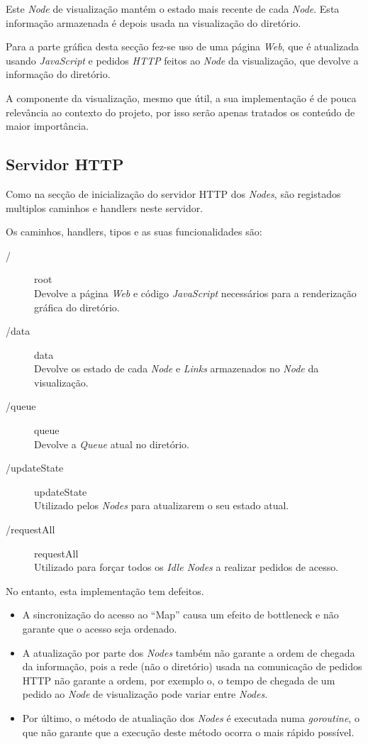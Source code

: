 Este \emph{Node} de visualização mantém o estado mais recente de cada \emph{Node}. 
Esta informação armazenada é depois usada na visualização do diretório.

Para a parte gráfica desta secção fez-se uso de uma página \emph{Web}, que é atualizada usando \emph{JavaScript} e 
pedidos \emph{HTTP} feitos ao \emph{Node} da visualização, que devolve a informação do diretório.

A componente da visualização, mesmo que útil, a sua implementação é de pouca relevância ao contexto do projeto,
por isso serão apenas tratados os conteúdo de maior importância.



\subsection{Servidor \acs{HTTP}}
Como na secção de inicialização do servidor \acs{HTTP} dos \emph{Nodes}, são registados 
multiplos caminhos e handlers neste servidor.

Os caminhos, handlers, tipos e as suas funcionalidades são:
\begin{description}
\item [/] root  \\ Devolve a página \emph{Web} e código \emph{JavaScript} necessários para a renderização gráfica do diretório.
\item [/data] data \\ Devolve os estado de cada \emph{Node} e \emph{Links} armazenados no \emph{Node} da visualização.
\item [/queue] queue \\ Devolve a \emph{Queue} atual no diretório.
\item [/updateState] updateState \\ Utilizado pelos \emph{Nodes} para atualizarem o seu estado atual.
\item [/requestAll] requestAll \\Utilizado para forçar todos os \emph{Idle Nodes} a realizar pedidos de acesso.
\end{description}

No entanto, esta implementação tem defeitos. 
\begin{itemize}
	\item 
A sincronização do acesso ao ``Map'' causa um efeito de bottleneck e não garante que o acesso seja ordenado.

	\item 
A atualização por parte dos \emph{Nodes} também não garante a ordem de chegada da informação, pois a rede (não o diretório) usada
na comunicação de pedidos \acs{HTTP} não garante a ordem, por exemplo o, o tempo de chegada de um pedido ao \emph{Node} de visualização
pode variar entre \emph{Nodes}.

	\item 
Por último, o método de atualiação dos \emph{Nodes} é executada numa \emph{goroutine}, o que não garante que a execução deste método 
ocorra o mais rápido possível.

\end{itemize}

